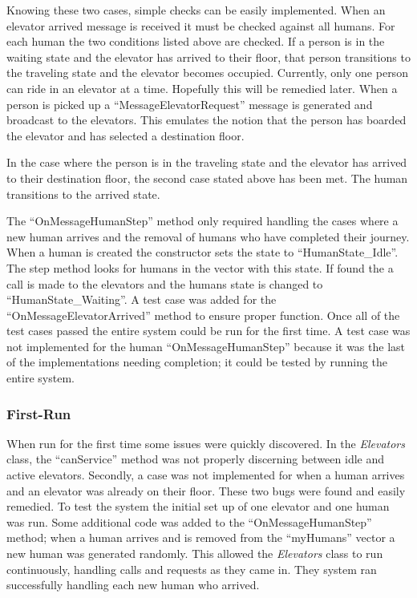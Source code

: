 \documentclass{article}
\begin{document}
Knowing these two cases, simple checks can be easily implemented.
When an elevator arrived message is received it must be checked against all humans.
For each human the two conditions listed above are checked.
If a person is in the waiting state and the elevator has arrived to their floor, that person transitions to the traveling state and the elevator becomes occupied.
Currently, only one person can ride in an elevator at a time.
Hopefully this will be remedied later.
When a person is picked up a ``MessageElevatorRequest'' message is generated and broadcast to the elevators.
This emulates the notion that the person has boarded the elevator and has selected a destination floor.\newline

In the case where the person is in the traveling state and the elevator has arrived to their destination floor, the second case stated above has been met.
The human transitions to the arrived state.

The ``OnMessageHumanStep'' method only required handling the cases where a new human arrives and the removal of humans who have completed their journey.
When a human is created the constructor sets the state to ``HumanState\_Idle''. 
The step method looks for humans in the vector with this state. 
If found the a call is made to the elevators and the humans state is changed to ``HumanState\_Waiting''.
A test case was added for the ``OnMessageElevatorArrived'' method to ensure proper function.
Once all of the test cases passed the entire system could be run for the first time.
A test case was not implemented for the human ``OnMessageHumanStep'' because it was the last of the implementations needing completion; it could be tested by running the entire system.

\subsubsection{First-Run}
When run for the first time some issues were quickly discovered.
In the \textit{Elevators} class, the ``canService'' method was not properly discerning between idle and active elevators.
Secondly, a case was not implemented for when a human arrives and an elevator was already on their floor. 
These two bugs were found and easily remedied.
To test the system the initial set up of one elevator and one human was run.
Some additional code was added to the ``OnMessageHumanStep'' method; when a human arrives and is removed from the ``myHumans'' vector a new human was generated randomly.
This allowed the \textit{Elevators} class to run continuously, handling calls and requests as they came in.
They system ran successfully handling each new human who arrived.
\end{document}
